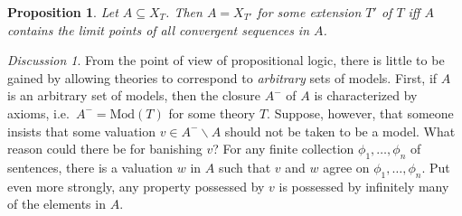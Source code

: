 \documentclass[11pt]{article}
\newtheorem{prop}{Proposition}
\theoremstyle{definition}
\theoremstyle{remark}
\newtheorem*{disc}{Discussion}
\begin{document}
\begin{prop} Let $A\subseteq X_T$.  Then $A=X_{T'}$ for some extension
  $T'$ of $T$ iff $A$ contains the limit points of all convergent
  sequences in $A$.  \end{prop}


\begin{disc} From the point of view of propositional logic, there is
  little to be gained by allowing theories to correspond to
  \emph{arbitrary} sets of models.  First, if $A$ is an arbitrary set
  of models, then the closure $A^{-}$ of $A$ is characterized by
  axioms, i.e.\ $A^{-}=\mathrm{Mod}(T)$ for some theory $T$.  Suppose,
  however, that someone insists that some valuation $v\in
  A^{-}\backslash A$ should not be taken to be a model.  What reason
  could there be for banishing $v$?  For any finite collection $\phi
  _1,\dots ,\phi _n$ of sentences, there is a valuation $w$ in $A$
  such that $v$ and $w$ agree on $\phi _1,\dots ,\phi _n$.  Put even
  more strongly, any property possessed by $v$ is possessed by
  infinitely many of the elements in $A$.
\end{disc}
\end{document}
